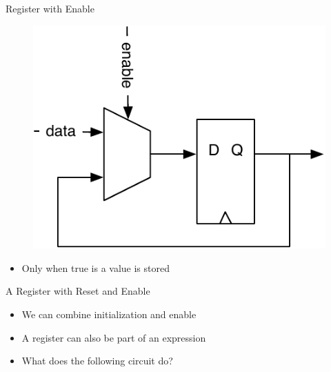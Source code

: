 \begin{frame}[fragile]{Register with Enable}
\begin{figure}
  \includegraphics[scale=\scale]{../figures/register-enable}
\end{figure}
\begin{itemize}
\item Only when  true is a value is stored
\end{itemize}

\end{frame}

\begin{frame}[fragile]{A Register with Reset and Enable}
\begin{itemize}
\item We can combine initialization and enable
\end{itemize}
\begin{itemize}
\item A register can also be part of an expression
\item What does the following circuit do?
\end{itemize}
\end{frame}


